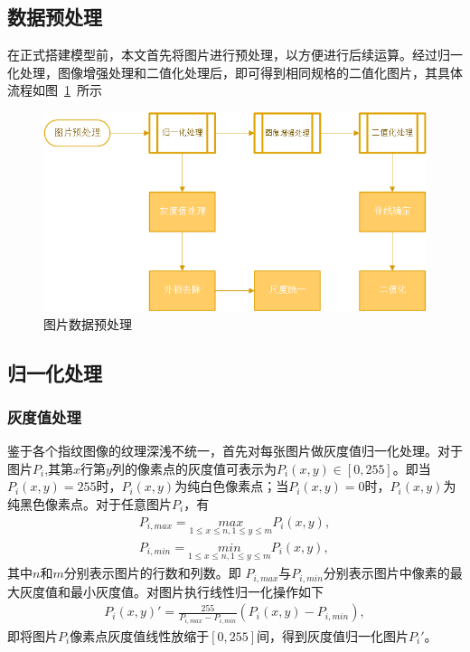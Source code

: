 \documentclass{whutmod}
\begin{document}
\begin{itemize}
	\section{数据预处理}
在正式搭建模型前，本文首先将图片进行预处理，以方便进行后续运算。经过归一化处理，图像增强处理和二值化处理后，即可得到相同规格的二值化图片，其具体流程如图~\ref{dfsg}~所示
\begin{figure}[H]
	\centering
	\includegraphics[width=.9\textwidth]{figures/chou4.png}
	\caption{图片数据预处理}\label{dfsg}
\end{figure}   
\subsection{归一化处理}
\subsubsection{灰度值处理}
鉴于各个指纹图像的纹理深浅不统一，首先对每张图片做灰度值归一化处理。对于图片$P_{i}$,其第$x$行第$y$列的像素点的灰度值可表示为$P_{i}(x,y)\in[0,255]$。即当$P_{i}(x,y)=255$时，$P_{i}(x,y)$为纯白色像素点；当$P_{i}(x,y)=0$时，$P_{i}(x,y)$为纯黑色像素点。对于任意图片$P_{i}$，有
\begin{gather*}
	P_{i,max}=\underset{1\leqslant x\leqslant n,1\leqslant y \leqslant  m}{max}P_{i}(x,y),\\
	P_{i,min}=\underset{1\leqslant x\leqslant n,1\leqslant y \leqslant  m}{min}P_{i}(x,y),
\end{gather*}
其中$n$和$m$分别表示图片的行数和列数。即	$P_{i,max}$与$P_{i,min}$分别表示图片中像素的最大灰度值和最小灰度值。对图片执行线性归一化操作如下
\begin{gather*}
	P_i(x,y)'=\frac{255}{P_{i,max}-P_{i,min}}(P_i(x,y)-P_{i,min}),
\end{gather*}
即将图片$P_i$像素点灰度值线性放缩于$[0,255]$间，得到灰度值归一化图片$P_i'$。


\end{itemize}
\end{document}
